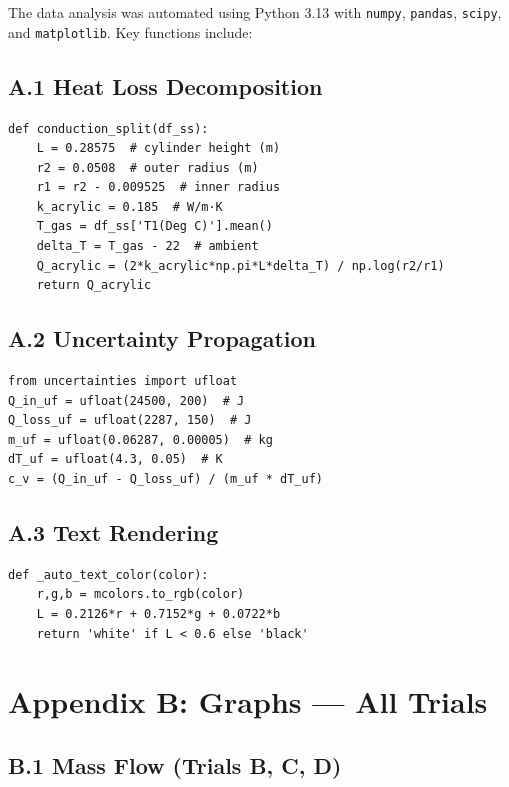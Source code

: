 \documentclass[12pt]{article}
\begin{document}
The data analysis was automated using Python 3.13 with \texttt{numpy}, \texttt{pandas}, \texttt{scipy}, and \texttt{matplotlib}. Key functions include:

\subsection*{A.1 Heat Loss Decomposition}

\begin{verbatim}
def conduction_split(df_ss):
    L = 0.28575  # cylinder height (m)
    r2 = 0.0508  # outer radius (m)
    r1 = r2 - 0.009525  # inner radius
    k_acrylic = 0.185  # W/m·K
    T_gas = df_ss['T1(Deg C)'].mean()
    delta_T = T_gas - 22  # ambient
    Q_acrylic = (2*k_acrylic*np.pi*L*delta_T) / np.log(r2/r1)
    return Q_acrylic
\end{verbatim}

\subsection*{A.2 Uncertainty Propagation}

\begin{verbatim}
from uncertainties import ufloat
Q_in_uf = ufloat(24500, 200)  # J
Q_loss_uf = ufloat(2287, 150)  # J
m_uf = ufloat(0.06287, 0.00005)  # kg
dT_uf = ufloat(4.3, 0.05)  # K
c_v = (Q_in_uf - Q_loss_uf) / (m_uf * dT_uf)
\end{verbatim}

\subsection*{A.3 Text Rendering}

\begin{verbatim}
def _auto_text_color(color):
    r,g,b = mcolors.to_rgb(color)
    L = 0.2126*r + 0.7152*g + 0.0722*b
    return 'white' if L < 0.6 else 'black'
\end{verbatim}

\section*{Appendix B: Graphs — All Trials}

\subsection*{B.1 Mass Flow (Trials B, C, D)}
\end{document}

